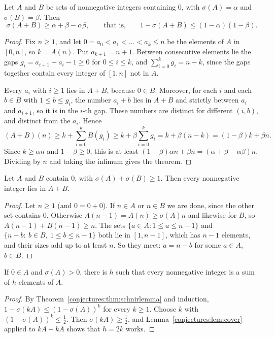 \begin{theorem}\label{conjectures:thm:schnirlemma}
Let $A$ and $B$ be sets of nonnegative integers containing $0$, with $\sigma(A)=\alpha$ and $\sigma(B)=\beta$. Then
\[
\sigma(A+B)\ge\alpha+\beta-\alpha\beta,\qquad\text{that is,}\qquad1-\sigma(A+B)\le(1-\alpha)(1-\beta).
\]
\end{theorem}
\begin{proof}
Fix $n\ge1$, and let $0=a_0<a_1<\dots<a_k\le n$ be the elements of $A$ in $[0,n]$, so $k=A(n)$. Put $a_{k+1}=n+1$. Between consecutive elements lie the
gaps $g_i=a_{i+1}-a_i-1\ge0$ for $0\le i\le k$, and $\sum_{i=0}^kg_i=n-k$, since the gaps together contain every integer of $[1,n]$ not in $A$.

Every $a_i$ with $i\ge1$ lies in $A+B$, because $0\in B$. Moreover, for each $i$ and each $b\in B$ with $1\le b\le g_i$, the number $a_i+b$ lies in
$A+B$ and strictly between $a_i$ and $a_{i+1}$, so it is in the $i$-th gap. These numbers are distinct for different $(i,b)$, and distinct from the
$a_i$. Hence
\[
(A+B)(n)\ge k+\sum_{i=0}^kB(g_i)\ge k+\beta\sum_{i=0}^kg_i=k+\beta(n-k)=(1-\beta)k+\beta n.
\]
Since $k\ge\alpha n$ and $1-\beta\ge0$, this is at least $(1-\beta)\alpha n+\beta n=(\alpha+\beta-\alpha\beta)n$. Dividing by $n$ and taking the infimum
gives the theorem.
\end{proof}

\begin{lemma}\label{conjectures:lem:cover}
Let $A$ and $B$ contain $0$, with $\sigma(A)+\sigma(B)\ge1$. Then every nonnegative integer lies in $A+B$.
\end{lemma}
\begin{proof}
Let $n\ge1$ (and $0=0+0$). If $n\in A$ or $n\in B$ we are done, since the other set contains $0$. Otherwise $A(n-1)=A(n)\ge\sigma(A)n$ and likewise for
$B$, so $A(n-1)+B(n-1)\ge n$. The sets $\{a\in A:1\le a\le n-1\}$ and $\{n-b:\ b\in B,\ 1\le b\le n-1\}$ both lie in $[1,n-1]$, which has $n-1$
elements, and their sizes add up to at least $n$. So they meet: $a=n-b$ for some $a\in A$, $b\in B$.
\end{proof}

\begin{corollary}\label{conjectures:cor:basis}
If $0\in A$ and $\sigma(A)>0$, there is $h$ such that every nonnegative integer is a sum of $h$ elements of $A$.
\end{corollary}
\begin{proof}
By Theorem~\ref{conjectures:thm:schnirlemma} and induction, $1-\sigma(kA)\le(1-\sigma(A))^k$ for every $k\ge1$. Choose $k$ with $(1-\sigma(A))^k\le\frac12$. Then
$\sigma(kA)\ge\frac12$, and Lemma~\ref{conjectures:lem:cover} applied to $kA+kA$ shows that $h=2k$ works.
\end{proof}

